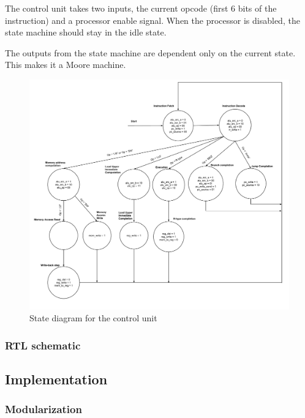 The control unit takes two inputs, the current opcode (first 6 bits of the instruction) and a processor enable signal.
When the processor is disabled, the state machine should stay in the idle state.

The outputs from the state machine are dependent only on the current state.
This makes it a Moore machine.

\begin{figure}[ht!]
    \begin{center}
    \includegraphics[width=\textwidth]{assets/state_machine.pdf}
    \caption{State diagram for the control unit}
    \label{fig:state_machine}
    \end{center}
\end{figure}

\subsubsection{RTL schematic}

\subsection{Implementation}

\subsubsection{Modularization}

